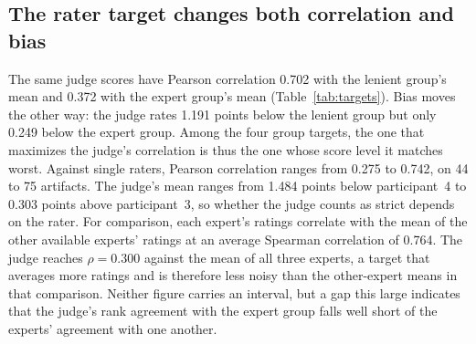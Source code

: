 \subsection{The rater target changes both correlation and bias}
\label{sec:target-results}
The same judge scores have Pearson correlation 0.702 with the lenient group's mean and 0.372 with the expert group's mean (Table~\ref{tab:targets}).
Bias moves the other way: the judge rates 1.191 points below the lenient group but only 0.249 below the expert group.
Among the four group targets, the one that maximizes the judge's correlation is thus the one whose score level it matches worst.
Against single raters, Pearson correlation ranges from 0.275 to 0.742, on 44 to 75 artifacts.
The judge's mean ranges from 1.484 points below participant~4 to 0.303 points above participant~3, so whether the judge counts as strict depends on the rater.
For comparison, each expert's ratings correlate with the mean of the other available experts' ratings at an average Spearman correlation of 0.764.
The judge reaches $\rho=0.300$ against the mean of all three experts, a target that averages more ratings and is therefore less noisy than the other-expert means in that comparison.
Neither figure carries an interval, but a gap this large indicates that the judge's rank agreement with the expert group falls well short of the experts' agreement with one another.

